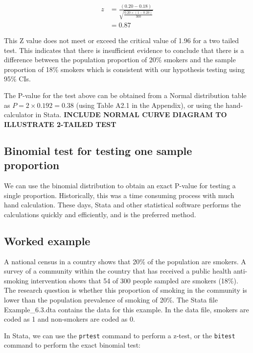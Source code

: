 \documentclass[
]{memoir}
\begin{document}
\[
\begin{aligned}
z &= \frac{(0.20 - 0.18)}{\sqrt{\frac{0.20 × (1 - 0.20)}{300}}} \\
 &= 0.87
\end{aligned}
\]

This Z value does not meet or exceed the critical value of 1.96 for a two tailed test. This indicates that there is insufficient evidence to conclude that there is a difference between the population proportion of 20\% smokers and the sample proportion of 18\% smokers which is consistent with our hypothesis testing using 95\% CIs.

The P-value for the test above can be obtained from a Normal distribution table as \(P = 2 × 0.192 = 0.38\) (using Table A2.1 in the Appendix), or using the hand-calculator in Stata. \textbf{INCLUDE NORMAL CURVE DIAGRAM TO ILLUSTRATE 2-TAILED TEST}

\hypertarget{binomial-test-for-testing-one-sample-proportion}{%
\subsection{Binomial test for testing one sample proportion}\label{binomial-test-for-testing-one-sample-proportion}}

We can use the binomial distribution to obtain an exact P-value for testing a single proportion. Historically, this was a time consuming process with much hand calculation. These days, Stata and other statistical software performs the calculations quickly and efficiently, and is the preferred method.

\hypertarget{worked-example-8}{%
\subsection{Worked example}\label{worked-example-8}}

A national census in a country shows that 20\% of the population are smokers. A survey of a community within the country that has received a public health anti-smoking intervention shows that 54 of 300 people sampled are smokers (18\%). The research question is whether this proportion of smoking in the community is lower than the population prevalence of smoking of 20\%. The Stata file Example\_6.3.dta contains the data for this example. In the data file, smokers are coded as 1 and non-smokers are coded as 0.

In Stata, we can use the \texttt{prtest} command to perform a z-test, or the \texttt{bitest} command to perform the exact binomial test:
\end{document}
